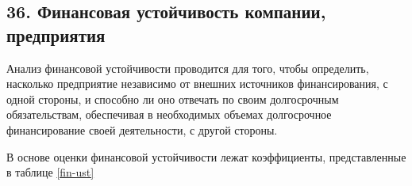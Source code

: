 \subsection*{36. Финансовая устойчивость компании, предприятия}

Анализ финансовой устойчивости проводится для того, чтобы определить, насколько предприятие независимо от внешних источников финансирования, с одной стороны, и способно ли оно отвечать по своим долгосрочным обязательствам, обеспечивая в необходимых объемах долгосрочное финансирование своей деятельности, с другой стороны.

В основе оценки финансовой устойчивости лежат коэффициенты, представленные в таблице \ref{fin-ust}


	\small
	
